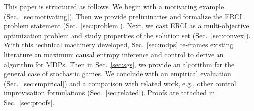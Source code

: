  This paper is structured as follows. We begin with a
motivating example (Sec.~\ref{sec:motivating}). Then we provide
preliminaries and formalize the ERCI problem statement
(Sec.~\ref{sec:problem}). Next, we cast ERCI
as a multi-objective optimization problem and study properties of the
solution set (Sec.~\ref{sec:convex}). With this technical machinery developed,
Sec.~\ref{sec:mdps} re-frames existing literature on maximum causal
entropy inference and control to derive an algorithm for MDPs.  Then in Sec.~\ref{sec:sgs}, we provide an
algorithm for the general case of stochastic games. We conclude with
an empirical evaluation (Sec.~\ref{sec:empirical}) and a comparison
with related work, e.g., other control improvisation
formulations (Sec.~\ref{sec:related}). Proofs are attached in Sec.~\ref{sec:proofs}.




